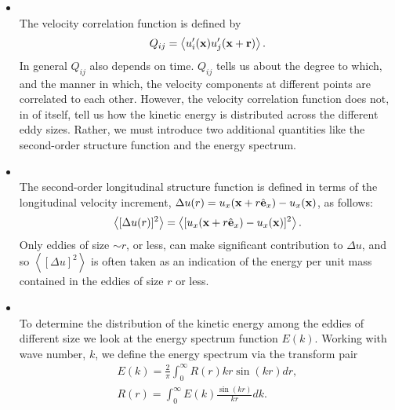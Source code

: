 \begin{itemize}
\item{}\\ The velocity correlation function is defined by
\begin{equation}
\label{eq-velocity_correlation}
Q_{ij}=\left\langle u_i'({\bf x})u_j'({\bf x}+{\bf r})\right\rangle.
\end{equation}
In general $Q_{ij}$ also depends on time. $Q_{ij}$ tells us about the degree to which, and the manner in which, the velocity components at different points are correlated to each other. However, the velocity correlation function does not, in of itself, tell us how the kinetic energy is distributed across the different eddy sizes. Rather, we must introduce two additional quantities like the second-order structure function and the energy spectrum.
\item{}\\ The second-order longitudinal structure function is defined in terms of the longitudinal velocity increment, $\Delta u(r)=u_x({\bf x}+r\hat{{\bf e}}_x)-u_x({\bf x})$, as follows:
\begin{equation}
\label{eq-second_order_structure}
\left\langle[\Delta u(r)]^2\right\rangle=\left\langle[u_x({\bf x}+r\hat{{\bf e}}_x)-u_x({\bf x})]^2\right\rangle.
\end{equation}
Only eddies of size $\sim r$, or less, can make significant contribution to $\Delta u$, and so $\left\langle[\Delta u]^2\right\rangle$ is often taken as an indication of the energy per unit mass contained in the eddies of size $r$ or less. 
\item{}\\ To determine the distribution of the kinetic energy among the eddies of different size we look at the energy spectrum function $E(k)$. Working with wave number, $k$, we define the energy spectrum via the transform pair
\begin{align}
\label{eq-energy_spectrum}
E(k)=\frac{2}{\pi}\int_0^\infty R(r)kr\sin(kr)dr,\\
\label{eq-autocovariance}
R(r)=\int_0^\infty E(k)\frac{\sin(kr)}{kr}dk.
\end{align}


\end{itemize}
